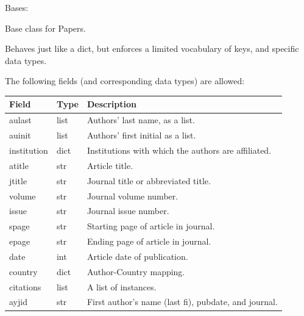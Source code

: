 \documentclass[letterpaper,10pt,english]{sphinxmanual}
\begin{document}

\begin{fulllineitems}
\label{tethne:tethne.data.Paper}
Bases: 

Base class for Papers.

Behaves just like a dict, but enforces a limited vocabulary of keys, and 
specific data types.

The following fields (and corresponding data types) are allowed:

\begin{tabulary}{\linewidth}{|L|L|L|}
\hline
\textbf{
Field
} & \textbf{
Type
} & \textbf{
Description
}\\\hline

aulast
 & 
list
 & 
Authors' last name, as a list.
\\\hline

auinit
 & 
list
 & 
Authors' first initial as a list.
\\\hline

institution
 & 
dict
 & 
Institutions with which the authors are affiliated.
\\\hline

atitle
 & 
str
 & 
Article title.
\\\hline

jtitle
 & 
str
 & 
Journal title or abbreviated title.
\\\hline

volume
 & 
str
 & 
Journal volume number.
\\\hline

issue
 & 
str
 & 
Journal issue number.
\\\hline

spage
 & 
str
 & 
Starting page of article in journal.
\\\hline

epage
 & 
str
 & 
Ending page of article in journal.
\\\hline

date
 & 
int
 & 
Article date of publication.
\\\hline

country
 & 
dict
 & 
Author-Country mapping.
\\\hline

citations
 & 
list
 & 
A list of {\hyperref[tethne:tethne.data.Paper]{}} instances.
\\\hline

ayjid
 & 
str
 & 
First author's name (last fi), pubdate, and journal.
\\\hline


\end{tabulary}
\end{fulllineitems}
\end{document}
